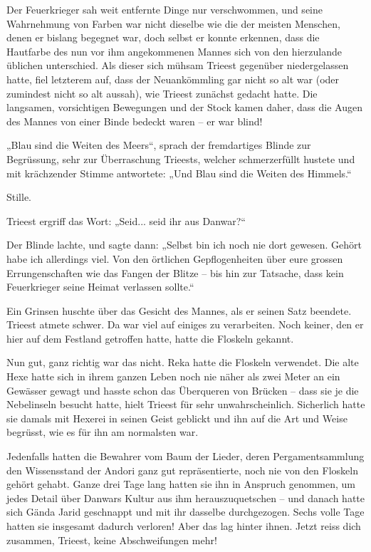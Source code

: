 Der Feuerkrieger sah weit entfernte Dinge nur verschwommen, und seine Wahrnehmung von Farben war nicht dieselbe wie die der meisten Menschen, denen er bislang begegnet war, doch selbst er konnte erkennen, dass die Hautfarbe des nun vor ihm angekommenen Mannes sich von den hierzulande üblichen unterschied. Als dieser sich mühsam Trieest gegenüber niedergelassen hatte, fiel letzterem auf, dass der Neuankömmling gar nicht so alt war (oder zumindest nicht so alt aussah), wie Trieest zunächst gedacht hatte. Die langsamen, vorsichtigen Bewegungen und der Stock kamen daher, dass die Augen des Mannes von einer Binde bedeckt waren – er war blind!\bigskip



„Blau sind die Weiten des Meers“, sprach der fremdartiges Blinde zur Begrüssung, sehr zur Überraschung Trieests, welcher schmerzerfüllt hustete und mit krächzender Stimme antwortete: „Und Blau sind die Weiten des Himmels.“

Stille.

Trieest ergriff das Wort: „Seid... seid ihr aus Danwar?“

Der Blinde lachte, und sagte dann: „Selbst bin ich noch nie dort gewesen. Gehört habe ich allerdings viel. Von den örtlichen Gepflogenheiten über eure grossen Errungenschaften wie das Fangen der Blitze – bis hin zur Tatsache, dass kein Feuerkrieger seine Heimat verlassen sollte.“

Ein Grinsen huschte über das Gesicht des Mannes, als er seinen Satz beendete. Trieest atmete schwer. Da war viel auf einiges zu verarbeiten. Noch keiner, den er hier auf dem Festland getroffen hatte, hatte die Floskeln gekannt.

Nun gut, ganz richtig war das nicht. Reka hatte die Floskeln verwendet. Die alte Hexe hatte sich in ihrem ganzen Leben noch nie näher als zwei Meter an ein Gewässer gewagt und hasste schon das Überqueren von Brücken – dass sie je die Nebelinseln besucht hatte, hielt Trieest für sehr unwahrscheinlich. Sicherlich hatte sie damals mit Hexerei in seinen Geist geblickt und ihn auf die Art und Weise begrüsst, wie es für ihn am normalsten war.

Jedenfalls hatten die Bewahrer vom Baum der Lieder, deren Pergamentsammlung den Wissensstand der Andori ganz gut repräsentierte, noch nie von den Floskeln gehört gehabt. Ganze drei Tage lang hatten sie ihn in Anspruch genommen, um jedes Detail über Danwars Kultur aus ihm herauszuquetschen – und danach hatte sich Gända Jarid geschnappt und mit ihr dasselbe durchgezogen. Sechs volle Tage hatten sie insgesamt dadurch verloren! Aber das lag hinter ihnen. Jetzt reiss dich zusammen, Trieest, keine Abschweifungen mehr!\bigskip



